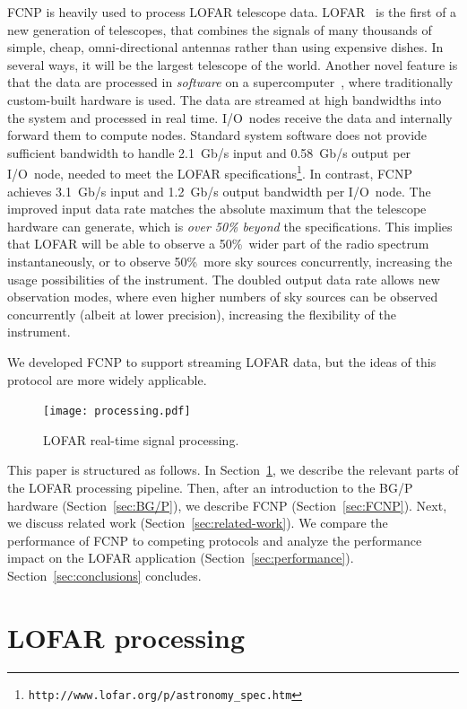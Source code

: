 \documentclass[journal]{IEEEtran}
\begin{document}
FCNP is heavily used to process LOFAR telescope data.
LOFAR~\cite{Butcher:04,deVos:09} is the first of a new generation of
telescopes, that
combines the signals of many thousands of simple, cheap, omni-directional
antennas rather than using expensive dishes.
In several ways, it will be the largest telescope of the world.
Another novel feature is that the data are processed in \emph{software\/} on a
supercomputer~\cite{Romein:06}, where traditionally custom-built hardware is
used.
The data are streamed at high bandwidths into the system and processed in real
time.
I/O~nodes receive the data and internally forward them to compute nodes.
Standard system software does not provide sufficient bandwidth to handle
2.1~Gb/s input and 0.58~Gb/s output per I/O~node, needed to meet the LOFAR
specifications\footnote{\texttt{http://www.lofar.org/p/astronomy\_spec.htm}}.
In contrast, FCNP achieves 3.1~Gb/s input and 1.2~Gb/s output bandwidth per
I/O~node.
The improved input data rate matches the absolute maximum that the telescope
hardware can generate, which is \emph{over 50\% beyond\/} the specifications.
This implies that LOFAR will be able to observe a 50\%~wider part of the radio
spectrum instantaneously, or to observe 50\%~more sky sources concurrently,
increasing the usage possibilities of the instrument.
The doubled output data rate allows new observation modes, where even higher
numbers of sky sources can be observed concurrently (albeit at lower
precision), increasing the flexibility of the instrument.

We developed FCNP to support streaming LOFAR data,
but the ideas of this protocol are more widely applicable.

\addtocounter{figure}{1}
\begin{figure}[t]
\texttt{[image: processing.pdf]}
\caption{LOFAR real-time signal processing.}
\label{fig:processing}
\end{figure}

This paper is structured as follows.
In Section~\ref{sec:LOFAR}, we describe the relevant parts of the LOFAR
processing pipeline.
Then, after an introduction to the BG/P
hardware (Section~\ref{sec:BG/P}), we describe FCNP (Section~\ref{sec:FCNP}).
Next, we discuss related work (Section~\ref{sec:related-work}).
We compare the performance of FCNP to competing protocols and analyze the
performance impact on the LOFAR application (Section~\ref{sec:performance}).
Section~\ref{sec:conclusions} concludes.



\section{LOFAR processing}
\label{sec:LOFAR}
\end{document}
